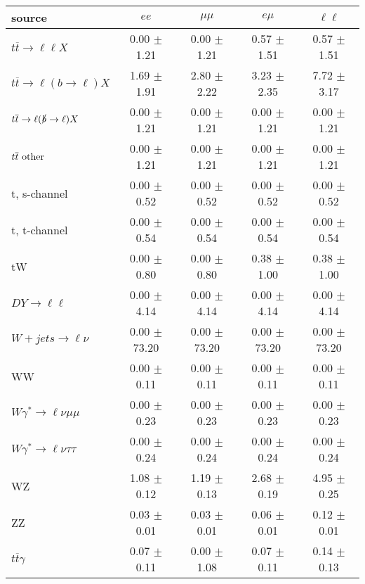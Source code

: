 \begin{tabular}{l|cccc} \hline\hline
source & $ee$ & $\mu\mu$ & $e\mu$ & $\ell\ell $ \\
\hline
$t\overline{t} \rightarrow \ell \ell X$ &  0.00 $\pm$  1.21 &  0.00 $\pm$  1.21 &  0.57 $\pm$  1.51 &  0.57 $\pm$  1.51 \\
$t\overline{t} \rightarrow \ell (b \rightarrow \ell) X$ &  1.69 $\pm$  1.91 &  2.80 $\pm$  2.22 &  3.23 $\pm$  2.35 &  7.72 $\pm$  3.17 \\
$t\overline{t} \rightarrow \ell (\slashed b \rightarrow \ell) X$ &  0.00 $\pm$  1.21 &  0.00 $\pm$  1.21 &  0.00 $\pm$  1.21 &  0.00 $\pm$  1.21 \\
        $t\overline{t}\ \rm{other}$ &  0.00 $\pm$  1.21 &  0.00 $\pm$  1.21 &  0.00 $\pm$  1.21 &  0.00 $\pm$  1.21 \\
\hline
                       t, s-channel &  0.00 $\pm$  0.52 &  0.00 $\pm$  0.52 &  0.00 $\pm$  0.52 &  0.00 $\pm$  0.52 \\
                       t, t-channel &  0.00 $\pm$  0.54 &  0.00 $\pm$  0.54 &  0.00 $\pm$  0.54 &  0.00 $\pm$  0.54 \\
                                 tW &  0.00 $\pm$  0.80 &  0.00 $\pm$  0.80 &  0.38 $\pm$  1.00 &  0.38 $\pm$  1.00 \\
\hline
         $DY \rightarrow \ell \ell$ &  0.00 $\pm$  4.14 &  0.00 $\pm$  4.14 &  0.00 $\pm$  4.14 &  0.00 $\pm$  4.14 \\
      $W+jets \rightarrow \ell \nu$ &  0.00 $\pm$ 73.20 &  0.00 $\pm$ 73.20 &  0.00 $\pm$ 73.20 &  0.00 $\pm$ 73.20 \\
                                 WW &  0.00 $\pm$  0.11 &  0.00 $\pm$  0.11 &  0.00 $\pm$  0.11 &  0.00 $\pm$  0.11 \\
\hline
$W\gamma^{*} \rightarrow \ell \nu \mu\mu$ &  0.00 $\pm$  0.23 &  0.00 $\pm$  0.23 &  0.00 $\pm$  0.23 &  0.00 $\pm$  0.23 \\
$W\gamma^{*} \rightarrow \ell \nu \tau\tau$ &  0.00 $\pm$  0.24 &  0.00 $\pm$  0.24 &  0.00 $\pm$  0.24 &  0.00 $\pm$  0.24 \\
                                 WZ &  1.08 $\pm$  0.12 &  1.19 $\pm$  0.13 &  2.68 $\pm$  0.19 &  4.95 $\pm$  0.25 \\
                                 ZZ &  0.03 $\pm$  0.01 &  0.03 $\pm$  0.01 &  0.06 $\pm$  0.01 &  0.12 $\pm$  0.01 \\
\hline
              $t\overline{t}\gamma$ &  0.07 $\pm$  0.11 &  0.00 $\pm$  1.08 &  0.07 $\pm$  0.11 &  0.14 $\pm$  0.13 \\

\end{tabular}
